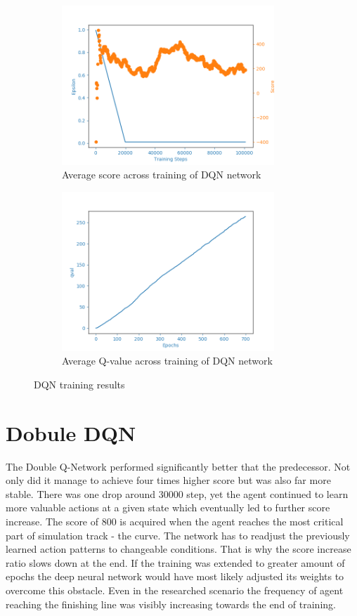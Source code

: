 \begin{figure}[htb]
\begin{subfigure}{.48\textwidth}
     \centering
    \includegraphics[width=8cm]{img/DQNAgent_WamvNavTwoSetsBuoys-v0_normal_1127_1016.png}
    \caption{Average score across training of DQN network}
    \label{fig:avg-score-dqn}   
\end{subfigure}
\begin{subfigure}{.48\textwidth}
    \centering
    \includegraphics[width=8cm]{img/DQNAgent_WamvNavTwoSetsBuoys-v0_normal_1127_1016_qval.png}
    \caption{Average Q-value across training of DQN network}
    \label{fig:avg-qval-dqn}
\end{subfigure}
\caption{DQN training results}
\label{fig:dqn-results}
\end{figure}

\newpage

\section{Dobule DQN}
\label{sec:results-double-dqn}

The Double Q-Network performed significantly better that the predecessor. Not only did it manage to achieve four times higher score but
was also far more stable. There was one drop around 30000 step, yet the agent continued to learn more valuable actions at a given state
which eventually led to further score increase. The score of 800 is acquired when the agent reaches the most critical part of
simulation track - the curve. The network has to readjust the previously learned action patterns to changeable conditions. That is why
the score increase ratio slows down at the end. If the training was extended to greater amount of epochs the deep neural network would
have most likely adjusted its weights to overcome this obstacle. Even in the researched scenario the frequency of agent reaching the
finishing line was visibly increasing towards the end of training.


